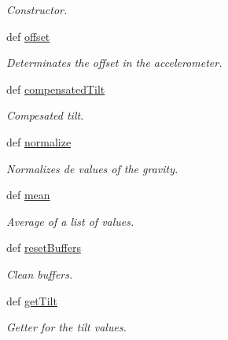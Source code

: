 \begin{DoxyCompactItemize}
\begin{DoxyCompactList}\small\item\em Constructor. \end{DoxyCompactList}\item 
def \hyperlink{classposture_1_1_posture_aaf778c81f563ea4eae7a46227085fb2b}{offset}
\begin{DoxyCompactList}\small\item\em Determinates the offset in the accelerometer. \end{DoxyCompactList}\item 
def \hyperlink{classposture_1_1_posture_aaf817d25ff93679ced24d2786e0944e2}{compensated\-Tilt}
\begin{DoxyCompactList}\small\item\em Compesated tilt. \end{DoxyCompactList}\item 
def \hyperlink{classposture_1_1_posture_a6548993924c0cbea896f6448d24491b8}{normalize}
\begin{DoxyCompactList}\small\item\em Normalizes de values of the gravity. \end{DoxyCompactList}\item 
def \hyperlink{classposture_1_1_posture_a301e34481371c95c06434f89b2a6ad39}{mean}
\begin{DoxyCompactList}\small\item\em Average of a list of values. \end{DoxyCompactList}\item 
def \hyperlink{classposture_1_1_posture_ad9bc6d06a96d33b488094a295a4c3f4c}{reset\-Buffers}
\begin{DoxyCompactList}\small\item\em Clean buffers. \end{DoxyCompactList}\item 
def \hyperlink{classposture_1_1_posture_ae8c17334701e824d29ede0fd6a8baa78}{get\-Tilt}
\begin{DoxyCompactList}\small\item\em Getter for the tilt values. \end{DoxyCompactList}\end{DoxyCompactItemize}
